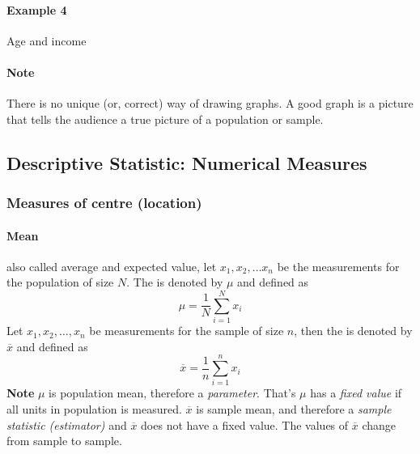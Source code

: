 \documentclass[11pt]{article}
\begin{document}
	\paragraph{Example 4} Age and income
	
	\paragraph{Note} There is no unique (or, correct) way of drawing graphs. A good graph is a picture that tells the audience a true picture of a population or sample.
	
	\subsection{Descriptive Statistic: Numerical Measures}
	\subsubsection{Measures of centre (location)}
	\paragraph{Mean} also called average and expected value, let $x_1, x_2, \dots x_n$ be the measurements for the population of size $N$. The  is denoted by $\mu$ and defined as 
	\[
		\mu = \frac{1}{N} \sum_{i=1}^N x_i
	\] Let $x_1, x_2, \dots, x_n$ be measurements for the sample of size $n$, then the  is denoted by $\overline{x}$ and defined as
	\[
		\overline{x} = \frac{1}{n} \sum_{i=1}^n x_i
	\]
	\newline
	\textbf{Note} $\mu$ is population mean, therefore a \emph{parameter}. That's $\mu$ has a \emph{fixed value} if all units in population is measured. $\overline{x}$ is sample mean, and therefore a \emph{sample statistic (estimator)} and $\overline{x}$ does not have a fixed value. The values of $\overline{x}$ change from sample to sample.
\end{document}

